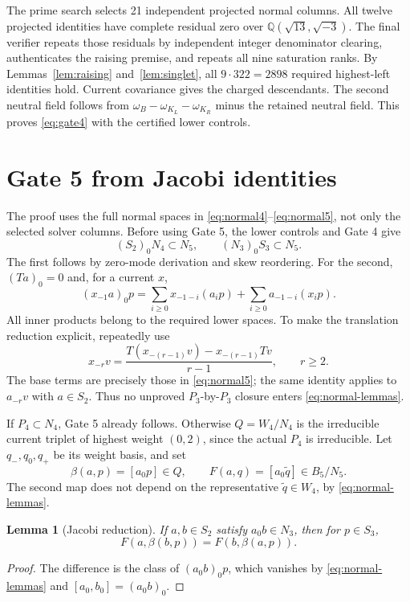 \documentclass[11pt,a4paper]{article}
\newtheorem{lemma}[theorem]{Lemma}
\theoremstyle{definition}
\newcommand{\QQ}{\mathbb Q}
\begin{document}
The prime search selects 21 independent projected normal columns.
All twelve projected identities have complete residual zero over
\(\QQ(\sqrt{13},\sqrt{-3})\). The final verifier repeats those
residuals by independent integer denominator clearing, authenticates
the raising premise, and repeats all nine saturation ranks. By
Lemmas~\ref{lem:raising} and~\ref{lem:singlet}, all \(9\cdot322=2898\)
required highest-left identities hold. Current covariance gives the
charged descendants. The second neutral field follows from
\(\omega_B-\omega_{K_L}-\omega_{K_R}\) minus the retained neutral field.
This proves \eqref{eq:gate4} with the certified lower controls.

\section{Gate 5 from Jacobi identities}\label{sec:gate5}
The proof uses the full normal spaces in
\eqref{eq:normal4}--\eqref{eq:normal5}, not only the selected solver
columns. Before using Gate 5, the lower controls and Gate 4 give
\begin{equation}\label{eq:normal-lemmas}
 (S_2)_0N_4\subset N_5,\qquad (N_3)_0S_3\subset N_5.
\end{equation}
The first follows by zero-mode derivation and skew reordering. For the
second, \((Ta)_0=0\) and, for a current \(x\),
\begin{equation}\label{eq:iterate}
 (x_{-1}a)_0p
 =\sum_{i\geq0}x_{-1-i}(a_ip)
  +\sum_{i\geq0}a_{-1-i}(x_ip).
\end{equation}
All inner products belong to the required lower spaces. To make the
translation reduction explicit, repeatedly use
\[
 x_{-r}v=\frac{T(x_{-(r-1)}v)-x_{-(r-1)}Tv}{r-1},\qquad r\geq2.
\]
The base terms are precisely those in \eqref{eq:normal5}; the same
identity applies to \(a_{-r}v\) with \(a\in S_2\). Thus no
unproved \(P_3\)-by-\(P_3\) closure enters \eqref{eq:normal-lemmas}.

If \(P_4\subset N_4\), Gate 5 already follows. Otherwise
\(Q=W_4/N_4\) is the irreducible current triplet of highest weight
\((0,2)\), since the actual \(P_4\) is irreducible. Let
\(q_-,q_0,q_+\) be its weight basis, and set
\[
 \beta(a,p)=[a_0p]\in Q,\qquad
 F(a,q)=[a_0\widetilde q]\in B_5/N_5.
\]
The second map does not depend on the representative
\(\widetilde q\in W_4\), by \eqref{eq:normal-lemmas}.

\begin{lemma}[Jacobi reduction]\label{lem:jacobi}
If \(a,b\in S_2\) satisfy \(a_0b\in N_3\), then for \(p\in S_3\),
\begin{equation}\label{eq:jacobi-reduction}
 F(a,\beta(b,p))=F(b,\beta(a,p)).
\end{equation}
\end{lemma}
\begin{proof}
The difference is the class of \((a_0b)_0p\), which vanishes by
\eqref{eq:normal-lemmas} and \([a_0,b_0]=(a_0b)_0\).
\end{proof}
\end{document}
